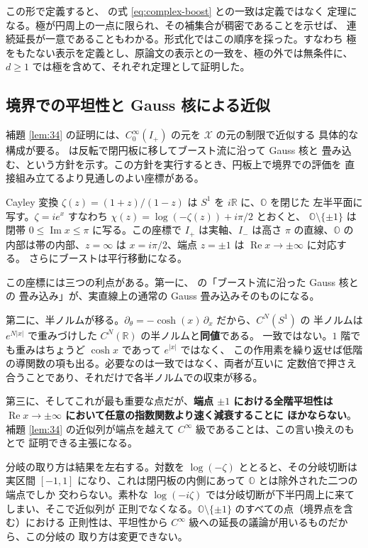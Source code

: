 \documentclass[11pt,a4paper]{article}
\newcommand{\Circ}{S^{1}}
\newcommand{\Xcl}{\mathcal{X}}
\newcommand{\Oex}{\mathbb{O}}
\newcommand{\abs}[1]{\lvert #1 \rvert}
\theoremstyle{definition}
\begin{document}
この形で定義すると、\cite{T26} の式 \eqref{eq:complex-boost} との一致は定義ではなく
定理になる。極が円周上の一点に限られ、その補集合が稠密であることを示せば、
連続延長が一意であることもわかる。形式化ではこの順序を採った。すなわち
極をもたない表示を定義とし、原論文の表示との一致を、極の外では無条件に、
$d \ge 1$ では極を含めて、それぞれ定理として証明した。

\subsection{境界での平坦性と Gauss 核による近似}
\label{sec:cayley}

補題 \ref{lem:34} の証明には、$C_0^\infty(I_+)$ の元を $\Xcl$ の元の制限で近似する
具体的な構成が要る。\cite{T26} は反転で閉円板に移してブースト流に沿って Gauss 核と
畳み込む、という方針を示す。この方針を実行するとき、円板上で境界での評価を
直接組み立てるより見通しのよい座標がある。

Cayley 変換 $\zeta(z) = (1+z)/(1-z)$ は $\Circ$ を $i\mathbb{R}$ に、$\Oex$ を閉じた
左半平面に写す。$\zeta = i e^{x}$ すなわち $\chi(z) = \log(-\zeta(z)) + i\pi/2$ とおくと、
$\Oex \setminus \{\pm 1\}$ は閉帯 $0 \le \operatorname{Im} x \le \pi$ に写る。この座標で
$I_+$ は実軸、$I_-$ は高さ $\pi$ の直線、$\Oex$ の内部は帯の内部、$z = \infty$ は
$x = i\pi/2$、端点 $z = \pm 1$ は $\operatorname{Re} x \to \pm\infty$ に対応する。
さらにブーストは平行移動になる。

この座標には三つの利点がある。第一に、\cite{T26} の「ブースト流に沿った Gauss 核との
畳み込み」が、実直線上の通常の Gauss 畳み込みそのものになる。

第二に、半ノルムが移る。$\partial_\theta = -\cosh(x)\, \partial_x$ だから、$C^N(\Circ)$ の
半ノルムは $e^{N\abs{x}}$ で重みづけした $C^N(\mathbb{R})$ の半ノルムと\textbf{同値}である。
一致ではない。$1$ 階でも重みはちょうど $\cosh x$ であって $e^{\abs{x}}$ ではなく、
この作用素を繰り返せば低階の導関数の項も出る。必要なのは一致ではなく、両者が互いに
定数倍で押さえ合うことであり、それだけで各半ノルムでの収束が移る。

第三に、そしてこれが最も重要な点だが、\textbf{端点 $\pm 1$ における全階平坦性は
$\operatorname{Re} x \to \pm\infty$ において任意の指数関数より速く減衰することに
ほかならない}。
補題 \ref{lem:34} の近似列が端点を越えて $C^\infty$ 級であることは、この言い換えのもとで
証明できる主張になる。

分岐の取り方は結果を左右する。対数を $\log(-\zeta)$ ととると、その分岐切断は実区間
$[-1, 1]$ になり、これは閉円板の内側にあって $\Oex$ とは除外された二つの端点でしか
交わらない。素朴な $\log(-i\zeta)$ では分岐切断が下半円周上に来てしまい、そこで近似列が
正則でなくなる。$\Oex \setminus \{\pm 1\}$ のすべての点（境界点を含む）における
正則性は、平坦性から $C^\infty$ 級への延長の議論が用いるものだから、この分岐の
取り方は変更できない。
\end{document}
